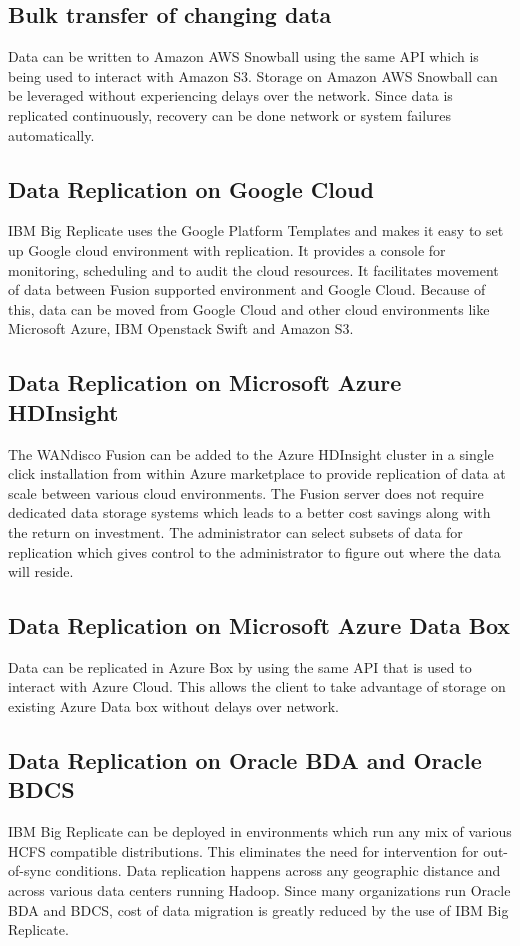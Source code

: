 \subsection{Bulk transfer of changing data}
Data can be written to Amazon AWS Snowball using the same API which is being
used to interact with Amazon S3. Storage on Amazon AWS Snowball can be leveraged
without experiencing delays over the network. Since data is replicated 
continuously, recovery can be done network or system failures automatically.

\subsection{Data Replication on Google Cloud}
IBM Big Replicate uses the Google Platform Templates and makes it easy to set up
Google cloud environment with replication. It provides a console for monitoring,
scheduling and to audit the cloud resources. It facilitates movement of data
between Fusion supported environment and Google Cloud. Because of this, data can
be moved from Google Cloud and other cloud environments like Microsoft Azure,
IBM Openstack Swift and Amazon S3.

\subsection{Data Replication on Microsoft Azure HDInsight}
The WANdisco Fusion can be added to the Azure HDInsight cluster in a single
click installation from within Azure marketplace to provide replication of data
at scale between various cloud environments. The Fusion server does not require
dedicated data storage systems which leads to a better cost savings along with 
the return on investment. The administrator can select subsets of data for
replication which gives control to the administrator to figure out where the 
data will reside.

\subsection{Data Replication on Microsoft Azure Data Box}
Data can be replicated in Azure Box by using the same API that is used to
interact with Azure Cloud. This allows the client to take advantage of storage
on existing Azure Data box without delays over network.

\subsection{Data Replication on Oracle BDA and Oracle BDCS}
IBM Big Replicate can be deployed in environments which run any mix of various 
HCFS compatible distributions. This eliminates the need for intervention for 
out-of-sync conditions. Data replication happens across any geographic distance
and across various data centers running Hadoop. Since many organizations run
Oracle BDA and BDCS, cost of data migration is greatly reduced by the use of 
IBM Big Replicate.


